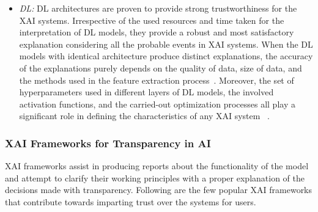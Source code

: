 \documentclass[journal]{IEEEtran}
\begin{document}
\begin{itemize}
    \item \textit{DL:} DL architectures are proven to provide strong trustworthiness for the XAI systems. Irrespective of the used resources and time taken for the interpretation of DL models, they provide a robust and most satisfactory explanation considering all the probable events in XAI systems. When the DL models with identical architecture produce distinct explanations, the accuracy of the explanations purely depends on the quality of data, size of data, and the methods used in the feature extraction process~\cite{watson2022agree}. Moreover, the set of hyperparameters used in different layers of DL models, the involved activation functions, and the carried-out optimization processes all play a significant role in defining the characteristics of any XAI system ~\cite{nascita2021xai}.

\end{itemize}

\subsubsection{XAI Frameworks for Transparency in AI}

XAI frameworks assist in producing reports about the functionality of the model and attempt to clarify their working principles with a proper explanation of the decisions made with transparency. Following are the few popular XAI frameworks that contribute towards imparting trust over the systems for users.
\end{document}
